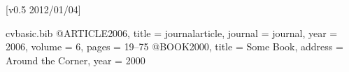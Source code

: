 [v0.5 2012/01/04]
\RequirePackage{filecontents}
\begin{filecontents}{cvbasic.bib}
@ARTICLE{2006,
  title = {journalarticle},
  journal = {journal},
  year = {2006},
  volume = {6},
  pages = {19--75}
}
@BOOK{2000,
  title = {Some Book},
  address = {Around the Corner},
  year = {2000}
}
\end{filecontents} 
\documentclass[%
fontsize=11pt,%
a4paper,%
pagesize,%
headinclude,footinclude,%
headings=normal,%
]{scrartcl}
\usepackage{scrpage2}
\usepackage[utf8]{inputenc}
\usepackage[T1]{fontenc}
\usepackage[ngerman]{babel}
\usepackage[german=quotes]{csquotes} 

\clubpenalty = 1000 %
\widowpenalty = 1000 %


\renewcommand*{\title}{Lebenslauf}%
\newcommand*{\firstname}{Minna}
\newcommand*{\familyname}{von Barnhelm}
\newcommand*{\acadtitle}{Dr.~h.\,c.~mult.}
\newcommand*{\addressstreet}{Way of no return 77}
\newcommand*{\addresscity}{9999 Hinterdemmond}
\newcommand*{\address}[2]{\addressstreet{#1}\addresscity{#2}}
\newcommand*{\phone}{001 23456789}
\newcommand*{\email}{minna@barnhelm.edu}





\usepackage[myblue]{koma-moderncvclassic} %

